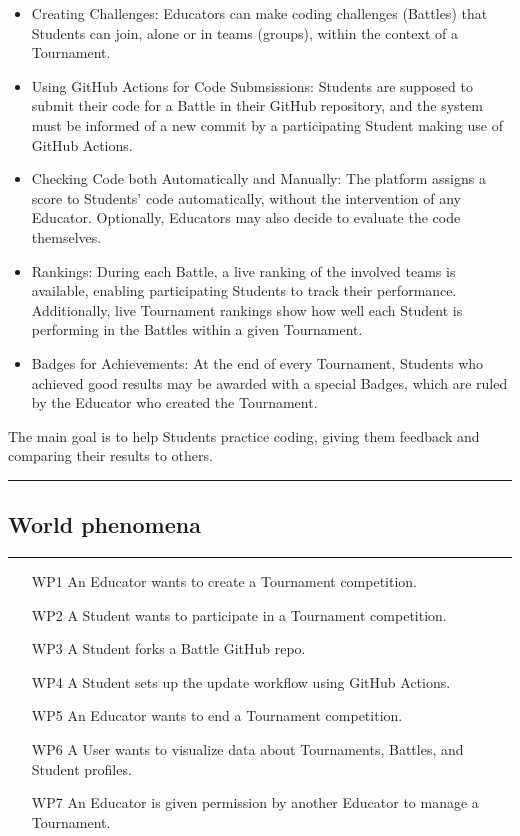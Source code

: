 \documentclass{Configuration_Files/Template}
\begin{document}
\begin{itemize}
\item \textcolor{bluepoli}{Creating Challenges:} Educators can make coding challenges (Battles) that Students can join, alone or in teams (groups), within the context of a Tournament.
\item \textcolor{bluepoli}{Using GitHub Actions for Code Submsissions:} Students are supposed to submit their code for a Battle in their GitHub repository, and the system must be informed of a new commit by a participating Student making use of GitHub Actions.
\item \textcolor{bluepoli}{Checking Code both Automatically and Manually:} The platform assigns a score to Students' code automatically, without the intervention of any Educator. Optionally, Educators may also decide to evaluate the code themselves.
\item \textcolor{bluepoli}{Rankings:} During each Battle, a live ranking of the involved teams is available, enabling participating Students to track their performance. Additionally, live Tournament rankings show how well each Student is performing in the Battles within a given Tournament.
\item \textcolor{bluepoli}{Badges for Achievements:} At the end of every Tournament, Students who achieved good results may be awarded with a special Badges, which are ruled by the Educator who created the Tournament.
\end{itemize}

The main goal is to help Students practice coding, giving them feedback and comparing their results to others.

{\color{bluepoli}\rule{\linewidth}{0.1pt}}

\subsection{World phenomena}

{\color{bluepoli}\rule{\linewidth}{0.1pt}}

\begin{enumerate}
    \item[\textcolor{bluepoli}{WP1}] An Educator wants to create a Tournament competition.
    \item[\textcolor{bluepoli}{WP2}] A Student wants to participate in a Tournament competition.
    \item[\textcolor{bluepoli}{WP3}] A Student forks a Battle GitHub repo.
    \item[\textcolor{bluepoli}{WP4}] A Student sets up the update workflow using GitHub Actions.
    \item[\textcolor{bluepoli}{WP5}] An Educator wants to end a Tournament competition.
    \item[\textcolor{bluepoli}{WP6}] A User wants to visualize data about Tournaments, Battles, and Student profiles.
    \item[\textcolor{bluepoli}{WP7}] An Educator is given permission by another Educator to manage a Tournament.
\end{enumerate}
\end{document}
